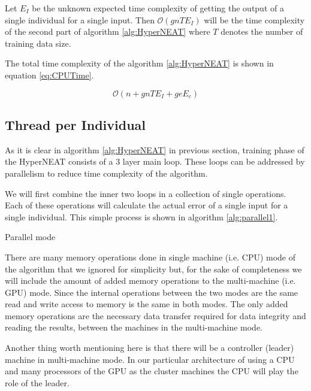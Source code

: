 \documentclass[twocolumn]{article}
\begin{document}
Let $E_I$ be the unknown expected time complexity of getting the output of a single individual for a single input. Then $\mathcal{O}(gnTE_I)$ will be the time complexity of the second part of algorithm \ref{alg:HyperNEAT} where $T$ denotes the number of training data size.

The total time complexity of the algorithm \ref{alg:HyperNEAT} is shown in equation \ref{eq:CPUTime}.

\begin{equation}
    \label{eq:CPUTime}
    \mathcal{O}(n+gnTE_I+geE_c)
\end{equation}

\subsection{Thread per Individual}

As it is clear in algorithm \ref{alg:HyperNEAT} in previous section, training phase of the HyperNEAT consists of a 3 layer main loop. These loops can be addressed by parallelism to reduce time complexity of the algorithm.

We will first combine the inner two loops in a collection of single operations. Each of these operations will calculate the actual error of a single input for a single individual. This simple process is shown in algorithm \ref{alg:parallel1}.

\begin{algorithm}
    \caption{Parallel mode}
    \label{alg:parallel1}
    \begin{algorithmic}
    \end{algorithmic}
\end{algorithm}

There are many memory operations done in single machine (i.e. CPU) mode of the algorithm that we ignored for simplicity but, for the sake of completeness we will include the amount of added memory operations to the multi-machine (i.e. GPU) mode. Since the internal operations between the two modes are the same read and write access to memory is the same in both modes. The only added memory operations are the necessary data transfer required for data integrity and reading the results, between the machines in the multi-machine mode.

Another thing worth mentioning here is that there will be a controller (leader) machine in multi-machine mode. In our particular architecture of using a CPU and many processors of the GPU as the cluster machines the CPU will play the role of the leader.
\end{document}
